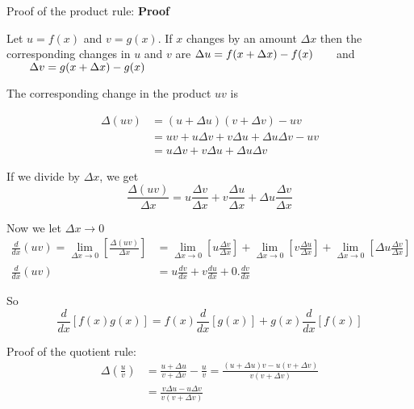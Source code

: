 Proof of the product rule:
\textbf{Proof} 

Let $u =f (x)$ and $v =g (x)$. If $x$ changes by an amount $ \Delta x$ then the corresponding changes in $u$ and $v$ are $ \Delta u =f (x + \Delta x) -f (x)\text{\quad \quad }$and$\text{\quad \quad } \Delta v =g (x + \Delta x) -g (x)$ 

The corresponding change in the product $u v$ is 


\begin{align*} \Delta (u v) &  = \left (u + \Delta u\right ) \left (v + \Delta v\right ) -u v \\
 &  = u v +u  \Delta v +v  \Delta u + \Delta u  \Delta v -u v \\
 &  = u  \Delta v +v  \Delta u + \Delta u  \Delta v\end{align*}

If we divide by $ \Delta x$, we get
\begin{equation*}\frac{ \Delta (u v)}{ \Delta x} =u \frac{ \Delta v}{ \Delta x} +v \frac{ \Delta u}{ \Delta x} + \Delta u \frac{ \Delta v}{ \Delta x}
\end{equation*}

Now we let $ \Delta x \rightarrow 0$
\begin{align*}\underset{}{\frac{d}{d x} \left (u v\right ) =\underset{ \Delta x \rightarrow 0}{\lim }} \genfrac{[}{]}{}{}{ \Delta (u v)}{ \Delta x} &  = \underset{ \Delta x \rightarrow 0}{\lim }\left [u \frac{ \Delta v}{ \Delta x}\right ] +\underset{}{\underset{ \Delta x \rightarrow 0}{\lim }\left [v \frac{ \Delta u}{ \Delta x}\right ]} +\underset{}{\underset{ \Delta x \rightarrow 0}{\lim }\left [ \Delta u \frac{ \Delta v}{ \Delta x}\right ]} \\
\frac{d}{d x} (u v) &  = u \frac{d v}{d x} +v \frac{d u}{d x} +0. \frac{d v}{d x}\end{align*}

So
\begin{equation*}\frac{d}{d x} \left [f (x) g (x)\right ] =f (x) \frac{d}{d x} \left [g (x)\right ] +g (x) \frac{d}{d x} \left [f (x)\right ]
\end{equation*}

Proof of the quotient rule:
\begin{align*} \Delta \genfrac{(}{)}{}{}{u}{v} &  = \frac{u + \Delta u}{v + \Delta v} -\frac{u}{v} =\frac{\left (u + \Delta u\right ) v -u \left (v + \Delta v\right )}{v \left (v + \Delta v\right )} \\
&  = \frac{v  \Delta u -u  \Delta v}{v \left (v + \Delta v\right )}\end{align*}

